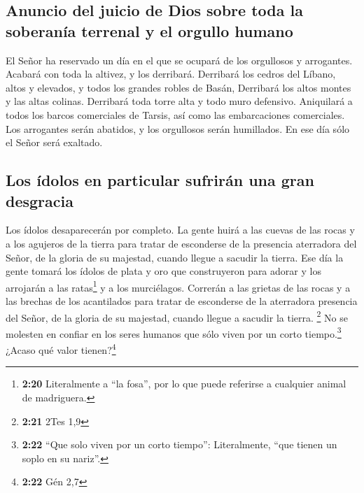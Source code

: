 \hypertarget{anuncio-del-juicio-de-dios-sobre-toda-la-soberanuxeda-terrenal-y-el-orgullo-humano}{%
\subsection{Anuncio del juicio de Dios sobre toda la soberanía terrenal
y el orgullo
humano}\label{anuncio-del-juicio-de-dios-sobre-toda-la-soberanuxeda-terrenal-y-el-orgullo-humano}}

 El Señor ha reservado un día en el que se ocupará de los
orgullosos y arrogantes. Acabará con toda la altivez, y los derribará.
 Derribará los cedros del Líbano, altos y elevados, y
todos los grandes robles de Basán,  Derribará los altos
montes y las altas colinas.  Derribará toda torre alta y
todo muro defensivo.  Aniquilará a todos los barcos
comerciales de Tarsis, así como las embarcaciones comerciales.
 Los arrogantes serán abatidos, y los orgullosos serán
humillados. En ese día sólo el Señor será exaltado.

\hypertarget{los-uxeddolos-en-particular-sufriruxe1n-una-gran-desgracia}{%
\subsection{Los ídolos en particular sufrirán una gran
desgracia}\label{los-uxeddolos-en-particular-sufriruxe1n-una-gran-desgracia}}

 Los ídolos desaparecerán por completo. 
La gente huirá a las cuevas de las rocas y a los agujeros de la tierra
para tratar de esconderse de la presencia aterradora del Señor, de la
gloria de su majestad, cuando llegue a sacudir la tierra.
 Ese día la gente tomará los ídolos de plata y oro que
construyeron para adorar y los arrojarán a las ratas\footnote{\textbf{2:20}
  Literalmente a ``la fosa'', por lo que puede referirse a cualquier
  animal de madriguera.} y a los murciélagos.  Correrán a
las grietas de las rocas y a las brechas de los acantilados para tratar
de esconderse de la aterradora presencia del Señor, de la gloria de su
majestad, cuando llegue a sacudir la tierra. \footnote{\textbf{2:21}
  2Tes 1,9}  No se molesten en confiar en los seres
humanos que sólo viven por un corto tiempo.\footnote{\textbf{2:22} ``Que
  solo viven por un corto tiempo'': Literalmente, ``que tienen un soplo
  en su nariz''.} ¿Acaso qué valor tienen?\footnote{\textbf{2:22} Gén
  2,7}

